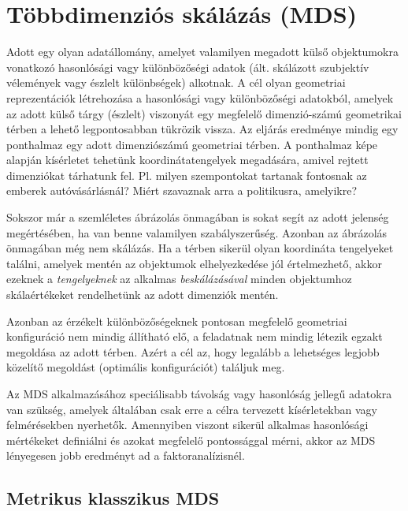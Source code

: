 \chapter{Többdimenziós skálázás (MDS)}

Adott egy olyan adatállomány, amelyet valamilyen megadott külső objektumokra vonatkozó hasonlósági vagy különbözőségi adatok (ált. skálázott szubjektív vélemények vagy észlelt különbségek) alkotnak. A cél olyan geometriai reprezentációk létrehozása a hasonlósági vagy különbözőségi adatokból, amelyek az adott külső tárgy (észlelt) viszonyát egy megfelelő dimenzió-számú geometrikai térben a lehető legpontosabban tükrözik vissza. Az eljárás eredménye mindig egy ponthalmaz egy adott dimenziószámú geometriai térben. A ponthalmaz képe alapján kísérletet tehetünk koordinátatengelyek megadására, amivel rejtett dimenziókat tárhatunk fel. Pl. milyen szempontokat tartanak fontosnak az emberek autóvásárlásnál? Miért szavaznak arra a politikusra, amelyikre?

Sokszor már a szemléletes ábrázolás önmagában is sokat segít az adott jelenség megértésében, ha van benne valamilyen szabályszerűség. Azonban az ábrázolás önmagában még nem skálázás. Ha a térben sikerül olyan koordináta tengelyeket találni, amelyek mentén az objektumok elhelyezkedése jól értelmezhető, akkor ezeknek a \emph{tengelyeknek} az alkalmas \emph{beskálázásával} minden objektumhoz skálaértékeket rendelhetünk az adott dimenziók mentén.

Azonban az érzékelt különbözőségeknek pontosan megfelelő geometriai konfiguráció nem mindig állítható elő, a feladatnak nem mindig létezik egzakt megoldása az adott térben. Azért a cél az, hogy legalább a lehetséges legjobb közelítő megoldást (optimális konfigurációt) találjuk meg.

Az MDS alkalmazásához speciálisabb távolság vagy hasonlóság jellegű adatokra van szükség, amelyek általában csak erre a célra tervezett kísérletekban vagy felmérésekben nyerhetők. Amennyiben viszont sikerül alkalmas hasonlósági mértékeket definiálni és azokat megfelelő pontossággal mérni, akkor az MDS lényegesen jobb eredményt ad a faktoranalízisnél.

\section{Metrikus klasszikus MDS}

